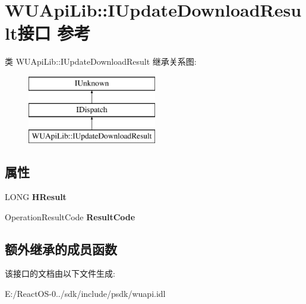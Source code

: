 \hypertarget{interface_w_u_api_lib_1_1_i_update_download_result}{}\section{W\+U\+Api\+Lib\+:\+:I\+Update\+Download\+Result接口 参考}
\label{interface_w_u_api_lib_1_1_i_update_download_result}
类 W\+U\+Api\+Lib\+:\+:I\+Update\+Download\+Result 继承关系图\+:\begin{figure}[H]
\begin{center}
\leavevmode
\includegraphics[height=3.000000cm]{interface_w_u_api_lib_1_1_i_update_download_result}
\end{center}
\end{figure}
\subsection*{属性}
\begin{DoxyCompactItemize}
\item 
\mbox{\label{interface_w_u_api_lib_1_1_i_update_download_result_a446bdb428c489cf622522102096fdde3}} 
L\+O\+NG {\bfseries H\+Result}
\item 
\mbox{\label{interface_w_u_api_lib_1_1_i_update_download_result_ae11e2e1a1dff8761fb958e811ddb1662}} 
Operation\+Result\+Code {\bfseries Result\+Code}
\end{DoxyCompactItemize}
\subsection*{额外继承的成员函数}


该接口的文档由以下文件生成\+:\begin{DoxyCompactItemize}
\item 
E\+:/\+React\+O\+S-\/0../sdk/include/psdk/wuapi.\+idl\end{DoxyCompactItemize}
